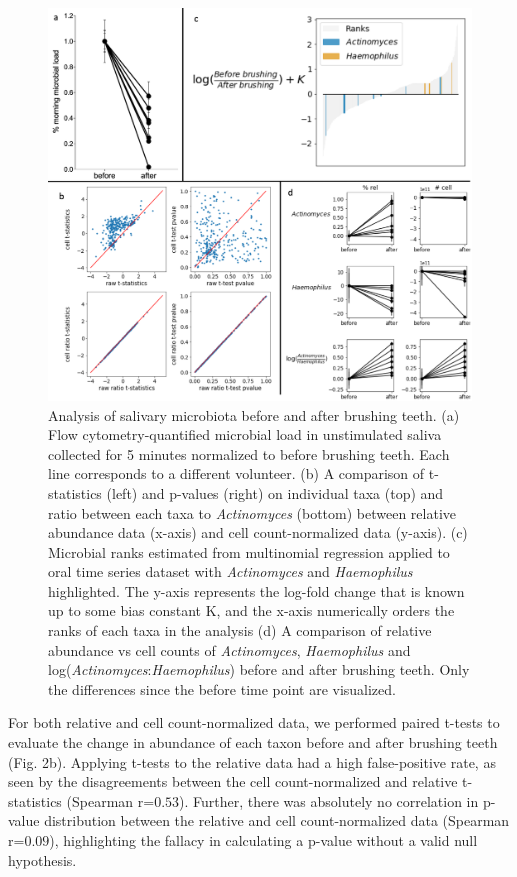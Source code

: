 \begin{figure}
  \includegraphics[width=1\textwidth]{ch4/Figure2.png}
  \caption[Analysis of salivary microbiota before and after brushing teeth.]{
    Analysis of salivary microbiota before and after brushing teeth. (a) Flow cytometry-quantified microbial
    load in unstimulated saliva collected for 5 minutes normalized to before brushing teeth. Each line corresponds
    to a different volunteer. (b) A comparison of t-statistics (left) and p-values (right) on individual taxa (top)
    and ratio between each taxa to \textit{Actinomyces} (bottom) between relative abundance data (x-axis) and cell
    count-normalized data (y-axis). (c) Microbial ranks estimated from multinomial regression applied to oral time
    series dataset with \textit{Actinomyces} and \textit{Haemophilus} highlighted.  The y-axis represents the log-fold change that is
    known up to some bias constant K, and the x-axis numerically orders the ranks of each taxa in the analysis
    (d) A comparison of relative abundance vs cell counts of \textit{Actinomyces}, \textit{Haemophilus} and log(\textit{Actinomyces}:\textit{Haemophilus})
    before and after brushing teeth. Only the differences since the before time point are visualized.}
\end{figure}

For both relative and cell count-normalized data, we performed paired t-tests to evaluate the change in abundance of each taxon before and after brushing teeth (Fig. 2b). Applying t-tests to the relative data had a high false-positive rate, as seen by the disagreements between the cell count-normalized and relative t-statistics (Spearman r=$0.53$). Further, there was absolutely no correlation in p-value distribution between the relative and cell count-normalized data (Spearman r=$0.09$), highlighting the fallacy in calculating a p-value without a valid null hypothesis.

